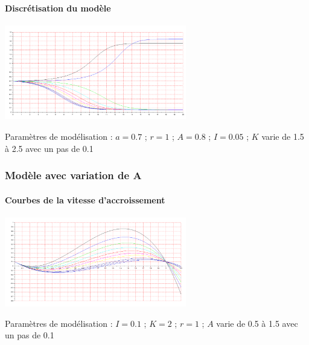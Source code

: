 \documentclass{article}
\begin{document}
\paragraph{}

\paragraph{Discrétisation du modèle}
\begin{center}
\includegraphics[width=300px]{img/part1/TrajK.png}
\end{center}
Paramètres de modélisation : $a=0.7$ ; $r=1$ ; $A=0.8$ ; $I=0.05$ ; $K$ varie de 1.5 à 2.5 avec un pas de 0.1
\paragraph{}

\subsubsection{Modèle avec variation de A}

\paragraph{Courbes de la vitesse d'accroissement}
\begin{center}
\includegraphics[width=300px]{img/part1/AlleeA.png}
\end{center}
Paramètres de modélisation : $I=0.1$ ; $K=2$ ; $r=1$  ; $A$ varie de 0.5 à 1.5 avec un pas de 0.1
\paragraph{}
\end{document}
